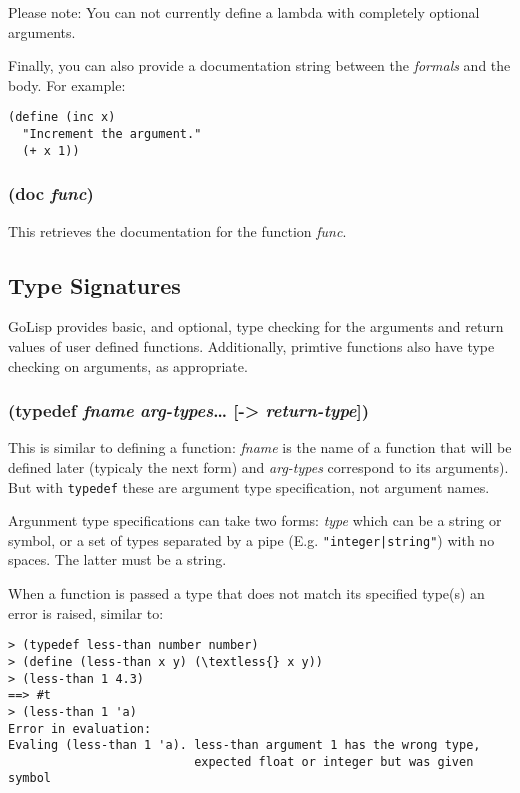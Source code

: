 \documentclass{article}
\begin{document}
Please note: You can not currently define a lambda with completely optional arguments.

Finally, you can also provide a documentation string between the \emph{formals} and the body.
For example:

\begin{verbatim}
(define (inc x) 
  "Increment the argument." 
  (+ x 1))
\end{verbatim}

\subsubsection{(doc \emph{func})}
 
This retrieves the documentation for the function \emph{func}.

\subsection{Type Signatures}\label{sec:type-signatures}

GoLisp provides basic, and optional, type checking for the arguments and return values of user
defined functions. Additionally, primtive functions also have type checking on arguments, as
appropriate.

\subsubsection{(typedef \emph{fname} \emph{arg-types}\ldots{} [-\textgreater{} \emph{return-type}])}

This is similar to defining a function: \emph{fname} is the name of a function that will be
defined later (typicaly the next form) and \emph{arg-types} correspond to its arguments). But
with \verb|typedef| these are argument type specification, not argument names.

Argunment type specifications can take two forms: \emph{type} which can be a string or symbol,
or a set of types separated by a pipe (E.g. \verb?"integer|string"?) with no spaces. The
latter must be a string.

When a function is passed a type that does not match its specified type(s) an error is raised,
similar to:


\begin{verbatim}
> (typedef less-than number number)
> (define (less-than x y) (\textless{} x y))
> (less-than 1 4.3)
==> #t
> (less-than 1 'a)
Error in evaluation: 
Evaling (less-than 1 'a). less-than argument 1 has the wrong type, 
                          expected float or integer but was given symbol
\end{verbatim}
\end{document}
